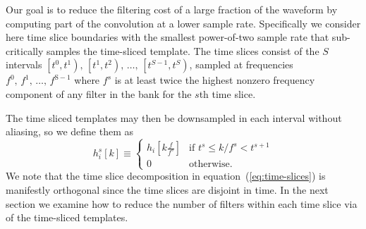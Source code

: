 Our goal is to reduce the filtering cost of a
large fraction of the waveform by computing part of the convolution at a lower
sample rate.  Specifically we consider here time slice boundaries with the
smallest power-of-two sample rate that sub-critically samples the time-sliced
template.  The time slices consist of the $S$ intervals
$\left[t^0, t^1\right),\, \left[t^1, t^2\right),\, \dots,\, \left[t^{S-1}, t^S\right)$,
sampled at frequencies $f^0,\, f^1,\, \dots,\, f^\mathrm{S-1}$ where $f^s$ is at
least twice the highest nonzero frequency component of any filter in the bank for the
$s$th time slice.

The time sliced templates may then be downsampled in each interval without
aliasing, so we define them as
%
\begin{equation}
\label{eq:time-sliced-templates}
h_{i}^{s}[k] \equiv
	\begin{cases}
		h_{i}\!\left[k\frac{f}{f^s}\right] & \textrm{if } t^s \leqslant k/f^s < t^{s+1} \\
		0 & \textrm{otherwise.}
	\end{cases}
\end{equation}
%
We note that the time slice decomposition in equation~(\ref{eq:time-slices}) is
manifestly orthogonal since the time slices are disjoint in time.  In the next
section we examine how to reduce the number of filters within each time slice
via \SVD{} of the time-sliced templates.


